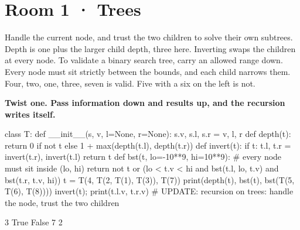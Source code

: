 \documentclass[11pt,a4paper]{report}
\begin{document}
\section*{Room 1 · Trees}
Handle the current node, and trust the two children to solve their own subtrees. Depth is one plus the larger child depth, three here. Inverting swaps the children at every node. To validate a binary search tree, carry an allowed range down. Every node must sit strictly between the bounds, and each child narrows them. Four, two, one, three, seven is valid. Five with a six on the left is not.
\begin{tcolorbox}[colback=yellow!12,colframe=orange!70!black,boxrule=0.4pt,left=4pt,right=4pt,top=2pt,bottom=2pt]\textbf{Twist one. Pass information down and results up, and the recursion writes itself.}\end{tcolorbox}
\begin{Code}
class T:
    def __init__(s, v, l=None, r=None): s.v, s.l, s.r = v, l, r
def depth(t): return 0 if not t else 1 + max(depth(t.l), depth(t.r))
def invert(t):
    if t: t.l, t.r = invert(t.r), invert(t.l)
    return t
def bst(t, lo=-10**9, hi=10**9):            # every node must sit inside (lo, hi)
    return not t or (lo < t.v < hi and bst(t.l, lo, t.v) and bst(t.r, t.v, hi))
t = T(4, T(2, T(1), T(3)), T(7))
print(depth(t), bst(t), bst(T(5, T(6), T(8))))
invert(t); print(t.l.v, t.r.v)
# UPDATE: recursion on trees: handle the node, trust the two children
\end{Code}
\begin{Out}
3 True False
7 2
\end{Out}
\end{document}
